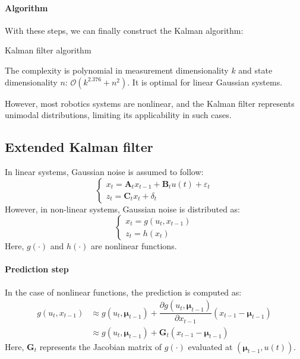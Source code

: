 \paragraph*{Algorithm} 
With these steps, we can finally construct the Kalman algorithm:
\begin{algorithm}[H]
    \caption{Kalman filter algorithm}
        \begin{algorithmic}[1]
             
              
            \State{}
        \end{algorithmic}
\end{algorithm}
The complexity is polynomial in measurement dimensionality $k$ and state dimensionality $n$: $\mathcal{O}(k^{2.376} + n^2)$.
It is optimal for linear Gaussian systems.

However, most robotics systems are nonlinear, and the Kalman filter represents unimodal distributions, limiting its applicability in such cases.

\subsection{Extended Kalman filter}
In linear systems, Gaussian noise is assumed to follow:
\[\begin{cases}
    x_t=\mathbf{A}_tx_{t-1}+\mathbf{B}_tu(t)+\varepsilon_t \\
    z_t=\mathbf{C}_tx_t+\delta_t
\end{cases}\]
However, in non-linear systems, Gaussian noise is distributed as:
\[\begin{cases}
    x_t=g(u_t,x_{t-1}) \\
    z_t=h(x_t)
\end{cases}\]
Here, $g(\cdot)$ and $h(\cdot)$ are nonlinear functions. 

\paragraph*{Prediction step}
In the case of nonlinear functions, the prediction is computed as:
\begin{align*}
    g(u_t,x_{t-1})  &\approx g(u_t,\boldsymbol{\mu}_{t-1})+\dfrac{\partial g(u_t,\boldsymbol{\mu}_{t-1})}{\partial x_{t-1}} (x_{t-1}-\boldsymbol{\mu}_{t-1}) \\
                    &\approx g(u_t,\boldsymbol{\mu}_{t-1})+\mathbf{G}_t(x_{t-1}-\boldsymbol{\mu}_{t-1})
\end{align*} 
Here, $\mathbf{G}_t$ represents the Jacobian matrix of $g(\cdot)$ evaluated at $\left(\boldsymbol{\mu}_{t-1},u(t)\right)$. 

